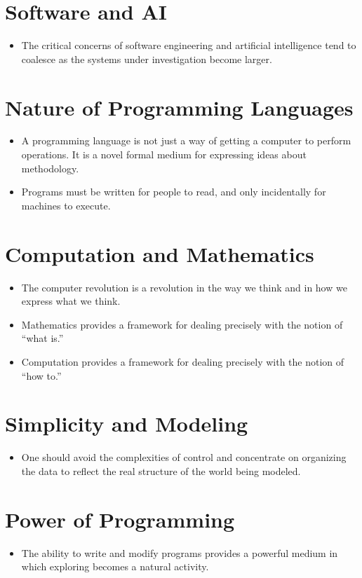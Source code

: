 \documentclass[12pt]{article}
\begin{document}
\section*{Software and AI}

\begin{itemize}[leftmargin=*]
    \item The critical concerns of software engineering and artificial intelligence tend to
    coalesce as the systems under investigation become larger.
\end{itemize}

\section*{Nature of Programming Languages}

\begin{itemize}[leftmargin=*]
    \item A programming language is not just a way of getting a computer to perform operations.
    It is a novel formal medium for expressing ideas about methodology.
    \item Programs must be written for people to read, and only incidentally for machines to
    execute.
\end{itemize}

\section*{Computation and Mathematics}

\begin{itemize}[leftmargin=*]
    \item The computer revolution is a revolution in the way we think and in how we express
    what we think.
    \item Mathematics provides a framework for dealing precisely with the notion of ``what is.''
    \item Computation provides a framework for dealing precisely with the notion of ``how to.''
\end{itemize}

\section*{Simplicity and Modeling}

\begin{itemize}[leftmargin=*]
    \item One should avoid the complexities of control and concentrate on organizing the data
    to reflect the real structure of the world being modeled.
\end{itemize}

\section*{Power of Programming}

\begin{itemize}[leftmargin=*]
    \item The ability to write and modify programs provides a powerful medium in which exploring
    becomes a natural activity.
\end{itemize}
\end{document}
